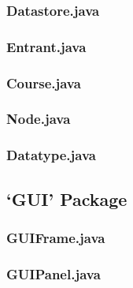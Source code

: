 \documentclass[a4paper, 10pt]{article}
\begin{document}
\subsubsection{Datastore.java}


\clearpage
\subsubsection{Entrant.java}


\clearpage
\subsubsection{Course.java}


\clearpage
\subsubsection{Node.java}


\subsubsection{Datatype.java}


\clearpage
\subsection{`GUI' Package}

\subsubsection{GUIFrame.java}


\subsubsection{GUIPanel.java}

\end{document}
